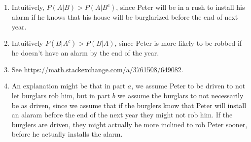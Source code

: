 \begin{enumerate}[label=(\alph*)]

\item Intuitively, $P(A|B) > P(A|B^{c})$, since Peter will be in a rush to 
install his alarm if he knows that his house will be burglarized before the 
end of next year.

\item Intuitively $P(B|A^{c}) > P(B|A)$, since Peter is more likely to be 
robbed if he doesn't have an alarm by the end of the year.

\item  See \url{https://math.stackexchange.com/a/3761508/649082}.

\item An explanation might be that in part $a$, we assume Peter to be driven 
to not let burglars rob him, but in part $b$ we assume the burglars to not 
necessarily be as driven, since we assume that if the burglers know that 
Peter will install an alaram before the end of the next year 
they might not rob him. If the burglers are driven, they might actually be 
more inclined to rob Peter sooner, before he actually installs the alarm.
\end{enumerate}